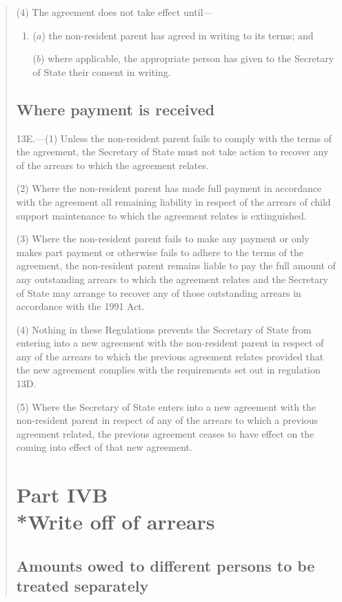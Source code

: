 \documentclass[12pt,a4paper]{article}
\begin{document}
\begin{quotation}
(4) The agreement does not take effect until—
\begin{enumerate}\item[]
($a$) the non-resident parent has agreed in writing to its terms; and

($b$) where applicable, the appropriate person has given to the Secretary of State their consent in writing.
\end{enumerate}

\subsection*{Where payment is received}

13E.---(1)  Unless the non-resident parent fails to comply with the terms of the agreement, the Secretary of State must not take action to recover any of the arrears to which the agreement relates.

(2) Where the non-resident parent has made full payment in accordance with the agreement all remaining liability in respect of the arrears of child support maintenance to which the agreement relates is extinguished.

(3) Where the non-resident parent fails to make any payment or only makes part payment or otherwise fails to adhere to the terms of the agreement, the non-resident parent remains liable to pay the full amount of any outstanding arrears to which the agreement relates and the Secretary of State may arrange to recover any of those outstanding arrears in accordance with the 1991 Act.

(4) Nothing in these Regulations prevents the Secretary of State from entering into a new agreement with the non-resident parent in respect of any of the arrears to which the previous agreement relates provided that the new agreement complies with the requirements set out in regulation 13D.

(5) Where the Secretary of State enters into a new agreement with the non-resident parent in respect of any of the arrears to which a previous agreement related, the previous agreement ceases to have effect on the coming into effect of that new agreement.

\section*{Part IVB\\*Write off of arrears}

\subsection*{\sloppy Amounts owed to different persons to be treat\-ed separately}


\end{quotation}
\end{document}
